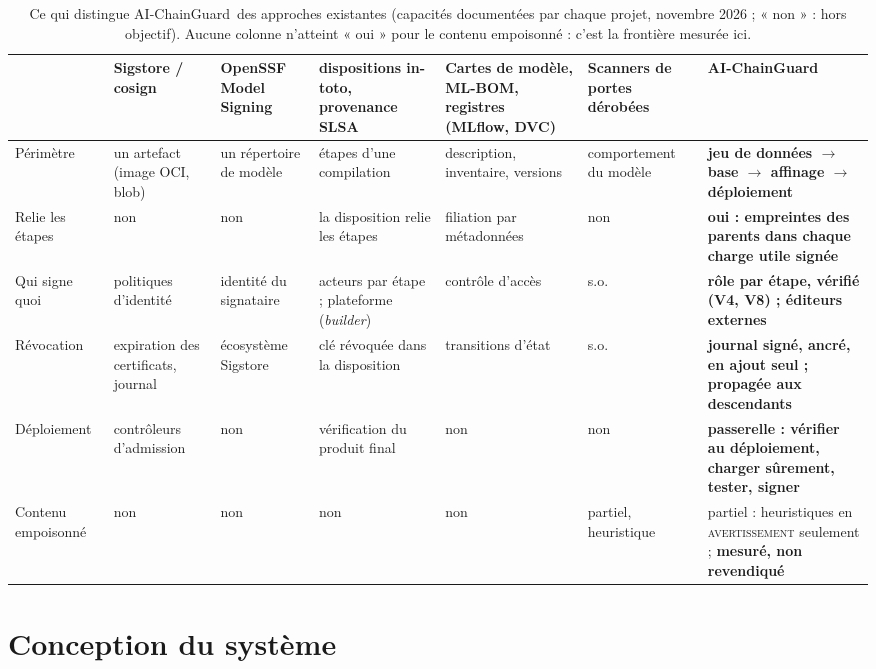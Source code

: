 \documentclass[conference]{IEEEtran}
\newcommand{\sys}{AI-ChainGuard}
\newcommand{\st}[1]{\textsc{#1}}
\begin{document}
\begin{table}[t]
\caption{Ce qui distingue \sys\ des approches existantes (capacités documentées par chaque projet, novembre 2026 ; « non » : hors objectif). Aucune colonne n'atteint « oui » pour le contenu empoisonné : c'est la frontière mesurée ici.}
\label{tab:compare}
\centering
\scriptsize
\setlength{\tabcolsep}{4pt}
\begin{tabular}{@{}>{\raggedright}p{2.0cm}>{\raggedright}p{1.9cm}>{\raggedright}p{1.9cm}>{\raggedright}p{2.1cm}>{\raggedright}p{2.5cm}>{\raggedright}p{1.8cm}>{\raggedright\arraybackslash}p{4.25cm}@{}}
\toprule
 & Sigstore / cosign & OpenSSF Model Signing & dispositions in-toto, provenance SLSA & Cartes de modèle, ML-BOM, registres (MLflow, DVC) & Scanners de portes dérobées & \textbf{\sys} \\
\midrule
Périmètre & un artefact (image OCI, blob) & un répertoire de modèle & étapes d'une compilation & description, inventaire, versions & comportement du modèle & \textbf{jeu de données $\to$ base $\to$ affinage $\to$ déploiement} \\
Relie les étapes & non & non & la disposition relie les étapes & filiation par métadonnées & non & \textbf{oui : empreintes des parents dans chaque charge utile signée} \\
Qui signe quoi & politiques d'identité & identité du signataire & acteurs par étape ; plateforme (\emph{builder}) & contrôle d'accès & s.o. & \textbf{rôle par étape, vérifié (V4, V8) ; éditeurs externes} \\
Révocation & expiration des certificats, journal & écosystème Sigstore & clé révoquée dans la disposition & transitions d'état & s.o. & \textbf{journal signé, ancré, en ajout seul ; propagée aux descendants} \\
Déploiement & contrôleurs d'admission & non & vérification du produit final & non & non & \textbf{passerelle : vérifier au déploiement, charger sûrement, tester, signer} \\
Contenu empoisonné & non & non & non & non & partiel, heuristique & partiel : heuristiques en \st{avertissement} seulement ; \textbf{mesuré, non revendiqué} \\
\bottomrule
\end{tabular}
\end{table}

\section{Conception du système}\label{sec:design}
\end{document}

